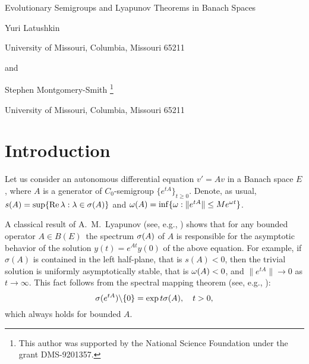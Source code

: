 
\begin{center}

{\huge Evolutionary Semigroups and Lyapunov Theorems in Banach Spaces}


\bigskip\bigskip
{\large Yuri Latushkin}

\bigskip
{\large  University of Missouri, Columbia, Missouri 65211}

\bigskip
{\large and}

\bigskip
{\large Stephen Montgomery-Smith}
\footnote{This author was supported by
  the National Science
  Foundation under the grant  DMS-9201357.}






\bigskip
{\large  University of Missouri, Columbia, Missouri 65211}


\end{center}
\baselineskip=16pt

\begin{abstract}
We present a spectral mapping theorem for continuous semigroups of
operators on any Banach space $E$.  The condition for the
hyperbolicity of a semigroup on $E$ is given in terms of
the generator of an evolutionary semigroup acting in the space of
$E$-valued functions.  The evolutionary semigroup generated by
the propagator of a nonautonomous differential
equation in $E$ is also studied.  A ``discrete'' technique for the
investigating of the evolutionary semigroup is developed and applied to
describe the hyperbolicity (exponential dichotomy) of the nonautonomous
equation.
\end{abstract}

\section{Introduction}
Let us consider an autonomous differential equation $v' =Av$ in a Banach
space $E$, where $A$ is a generator of $C_0$-semigroup $\{e^{tA}\}_{t\geq
0}$.  Denote, as usual, $s(A) =\sup \{\operatorname{Re} \lambda: \lambda \in \sigma (A)\}$
and $\omega (A) =\inf \{ \omega : \|e^{tA}\| \leq Me^{\omega t}\}$.

A classical result of A.~M.~Lyapunov (see, e.g., \cite{9}) shows
that for any bounded operator $A\in B(E)$\
the spectrum $\sigma (A)$ of $A$ is
responsible for the asymptotic behavior of the solution
$y(t)=e^{At}y(0)$ of the above equation.  For example, if $\sigma (A)$
is contained in the left half-plane, that is
$s(A) <0$,
then the trivial solution is uniformly
asymptotically stable, that is
$\omega (A) <0$,
and $\|e^{tA}\| \to 0$ as $t\to \infty$.  This fact
follows from the spectral mapping theorem (see, e.g., \cite{21}):
\begin{equation}
\sig (e^{tA}) \bs \{0\} =\exp t \sig (A), \quad t>0,
\lb{smt}
\end{equation}
which always holds for bounded $A$.

